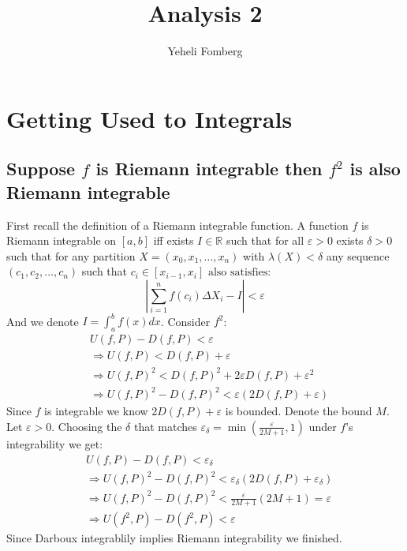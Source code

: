 \documentclass{article}
\title{\textbf{Analysis 2}}
\author{Yeheli Fomberg}
\date{}
\newcommand{\R}{\mathbb{R}}
\begin{document}
	\maketitle
	
	\newpage
	
	\tableofcontents
	
	\newpage
	
	\section{Getting Used to Integrals}
	\subsection{Suppose $f$ is Riemann integrable then $f^2$ is also Riemann integrable}
	First recall the definition of a Riemann integrable function. 
	A function $f$ is Riemann integrable on $[a,b]$ iff 
	exists $I\in\R$ such that for all $\varepsilon>0$ exists $\delta>0$ such that 
	for any partition $X = (x_0,x_1,\ldots,x_n)$ with $\lambda(X)<\delta$ any sequence 
	$(c_1,c_2,\ldots,c_n)$ such that $c_i\in[x_{i-1},x_i] \text{ also satisfies}:$
	\[
		\left|\sum_{i=1}^{n}{f(c_i)\Delta X_i}-I\right|<\varepsilon
	\]
	And we denote $I = \int_{a}^{b} f(x)dx$. Consider $f^2$:
	\begin{align*}
		&U(f,P) - D(f,P) < \varepsilon \\
		&\Rightarrow U(f,P) < D(f,P) + \varepsilon \\
		&\Rightarrow U(f,P)^2<D(f,P)^2 + 2\varepsilon D(f,P) + \varepsilon^2 \\
		&\Rightarrow U(f,P)^2 - D(f,P)^2 < \varepsilon (2D(f,P) + \varepsilon)
	\end{align*}	
	Since $f$ is integrable we know $2D(f,P) + \varepsilon$ is bounded.
	Denote the bound $M$.
	Let $\varepsilon > 0.$ Choosing the $\delta$ that matches $\varepsilon_{\delta} = \min(\frac{\varepsilon}{2M+1},1)$ under $f$'s integrability we get:
		\begin{align*}
		&U(f,P) - D(f,P) < \varepsilon_{\delta} \\
		&\Rightarrow U(f,P)^2 - D(f,P)^2 < \varepsilon_{\delta} (2D(f,P) + \varepsilon_{\delta})\\
		&\Rightarrow U(f,P)^2 - D(f,P)^2 <  \frac{\varepsilon}{2M+1} (2M + 1)=\varepsilon \\
		&\Rightarrow U(f^2,P) - D(f^2,P) < \varepsilon
		\end{align*}	
	Since Darboux integrablily implies Riemann integrability we finished.
\end{document}
